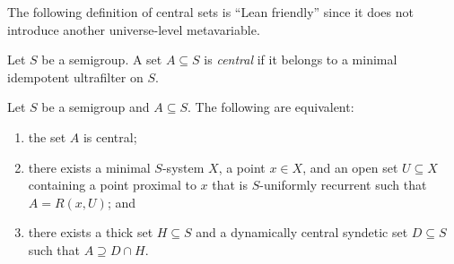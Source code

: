 The following definition of central sets is ``Lean friendly'' since it does not introduce another universe-level metavariable.

\begin{definition}
    Let $S$ be a semigroup.  A set $A \subseteq S$ is \emph{central} if it belongs to a minimal idempotent ultrafilter on $S$.
\end{definition}

\begin{theorem}
    Let $S$ be a semigroup and $A \subseteq S$.  The following are equivalent:
    \begin{enumerate}
        \item
        \label{item_minidemp_central}
        the set $A$ is central;

        \item 
        \label{item_f_central}
        there exists a minimal $S$-system $X$, a point $x \in X$, and an open set $U \subseteq X$ containing a point proximal to $x$ that is $S$-uniformly recurrent such that $A = R(x,U)$; and 

        \item
        \label{item_dcscapthick_central}
        there exists a thick set $H \subseteq S$ and a dynamically central syndetic set $D \subseteq S$ such that $A \supseteq D \cap H$.
    \end{enumerate}
\end{theorem}

